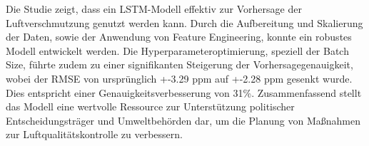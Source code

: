 \documentclass{article}
\begin{document}
Die Studie zeigt, dass ein LSTM-Modell effektiv zur Vorhersage der Luftverschmutzung genutzt werden kann.
Durch die Aufbereitung und Skalierung der Daten, sowie der Anwendung von Feature Engineering, konnte ein robustes Modell entwickelt werden.
Die Hyperparameteroptimierung, speziell der Batch Size, führte zudem zu einer signifikanten Steigerung der Vorhersagegenauigkeit, wobei der RMSE von ursprünglich +-3.29 ppm auf +-2.28 ppm gesenkt wurde.
Dies entspricht einer Genauigkeitsverbesserung von 31\%.
Zusammenfassend stellt das Modell eine wertvolle Ressource zur Unterstützung politischer Entscheidungsträger und Umweltbehörden dar, um die Planung von Maßnahmen zur Luftqualitätskontrolle zu verbessern.


\printbibliography

%   
%   
\end{document}
